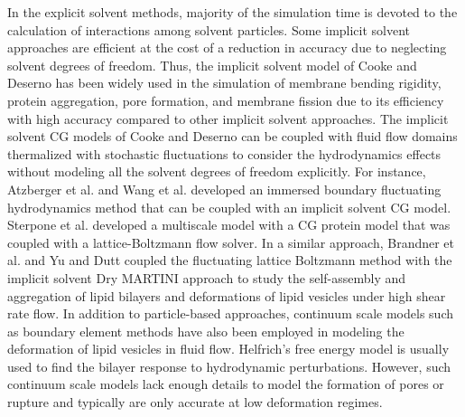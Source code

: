 In the explicit solvent methods, majority of the simulation time is devoted to the calculation of interactions among solvent particles. Some implicit solvent approaches are efficient at the cost of a reduction in accuracy due to neglecting solvent degrees of freedom. Thus, the implicit solvent model of Cooke and Deserno\cite{a33} has been widely used in the simulation of membrane bending rigidity\cite{a38}, protein aggregation\cite{a39}, pore formation\cite{a38,a40}, and membrane fission\cite{a41} due to its efficiency with high accuracy compared to other implicit solvent approaches. The implicit solvent CG models of Cooke and Deserno\cite{a33} can be coupled with fluid flow domains thermalized with stochastic fluctuations to consider the hydrodynamics effects without modeling all the solvent degrees of freedom explicitly. For instance, Atzberger et al.\cite{a42} and Wang et al.\cite{a43} developed an immersed boundary fluctuating hydrodynamics method that can be coupled with an implicit solvent CG model. Sterpone et al.\cite{a44} developed a multiscale model with a CG protein model that was coupled with a lattice-Boltzmann\cite{a45,a46} flow solver. In a similar approach, Brandner et al.\cite{a47} and Yu and Dutt\cite{a48} coupled the fluctuating lattice Boltzmann method\cite{a46} with the implicit solvent Dry MARTINI\cite{a26} approach to study the self-assembly and aggregation of lipid bilayers and deformations of lipid vesicles under high shear rate flow. In addition to particle-based approaches, continuum scale models such as boundary element methods have also been employed in modeling the deformation of lipid vesicles in fluid flow\cite{a49,a50}. Helfrich's free energy model\cite{a51} is usually used to find the bilayer response to hydrodynamic perturbations. However, such continuum scale models lack enough details to model the formation of pores or rupture and typically are only accurate at low deformation regimes. 


